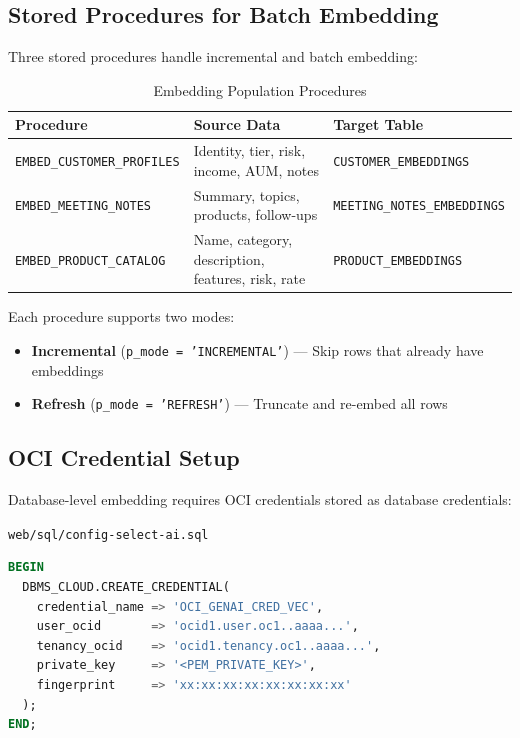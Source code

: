 \documentclass[12pt,a4paper]{article}
\begin{document}
\subsection{Stored Procedures for Batch Embedding}

Three stored procedures handle incremental and batch embedding:

\begin{table}[H]
\centering
\caption{Embedding Population Procedures}
\begin{tabularx}{\textwidth}{l X l}
\toprule
\textbf{Procedure} & \textbf{Source Data} & \textbf{Target Table} \\
\midrule
\texttt{EMBED\_CUSTOMER\_PROFILES} & Identity, tier, risk, income, AUM, notes & \texttt{CUSTOMER\_EMBEDDINGS} \\
\texttt{EMBED\_MEETING\_NOTES} & Summary, topics, products, follow-ups & \texttt{MEETING\_NOTES\_EMBEDDINGS} \\
\texttt{EMBED\_PRODUCT\_CATALOG} & Name, category, description, features, risk, rate & \texttt{PRODUCT\_EMBEDDINGS} \\
\bottomrule
\end{tabularx}
\end{table}

Each procedure supports two modes:
\begin{itemize}
  \item \textbf{Incremental} (\texttt{p\_mode = 'INCREMENTAL'}) — Skip rows that already have embeddings
  \item \textbf{Refresh} (\texttt{p\_mode = 'REFRESH'}) — Truncate and re-embed all rows
\end{itemize}

\subsection{OCI Credential Setup}

Database-level embedding requires OCI credentials stored as database credentials:

\texttt{web/sql/config-select-ai.sql}

\begin{lstlisting}[language=SQL, caption={OCI credential creation for in-database embedding}]
BEGIN
  DBMS_CLOUD.CREATE_CREDENTIAL(
    credential_name => 'OCI_GENAI_CRED_VEC',
    user_ocid       => 'ocid1.user.oc1..aaaa...',
    tenancy_ocid    => 'ocid1.tenancy.oc1..aaaa...',
    private_key     => '<PEM_PRIVATE_KEY>',
    fingerprint     => 'xx:xx:xx:xx:xx:xx:xx:xx'
  );
END;
\end{lstlisting}
\end{document}
